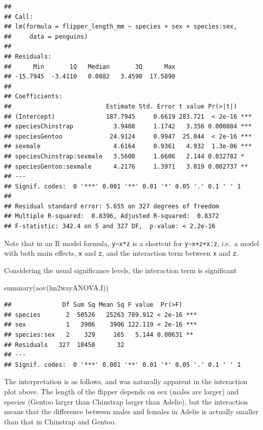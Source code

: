 \documentclass[
]{book}
\newenvironment{Shaded}{\begin{snugshade}}{\end{snugshade}}
\newcommand{\FunctionTok}[1]{\textcolor[rgb]{0.00,0.00,0.00}{#1}}
\newcommand{\NormalTok}[1]{#1}
\begin{document}
\begin{verbatim}
## 
## Call:
## lm(formula = flipper_length_mm ~ species + sex + species:sex, 
##     data = penguins)
## 
## Residuals:
##      Min       1Q   Median       3Q      Max 
## -15.7945  -3.4110   0.0882   3.4590  17.5890 
## 
## Coefficients:
##                          Estimate Std. Error t value Pr(>|t|)    
## (Intercept)              187.7945     0.6619 283.721  < 2e-16 ***
## speciesChinstrap           3.9408     1.1742   3.356 0.000884 ***
## speciesGentoo             24.9124     0.9947  25.044  < 2e-16 ***
## sexmale                    4.6164     0.9361   4.932  1.3e-06 ***
## speciesChinstrap:sexmale   3.5600     1.6606   2.144 0.032782 *  
## speciesGentoo:sexmale      4.2176     1.3971   3.019 0.002737 ** 
## ---
## Signif. codes:  0 '***' 0.001 '**' 0.01 '*' 0.05 '.' 0.1 ' ' 1
## 
## Residual standard error: 5.655 on 327 degrees of freedom
## Multiple R-squared:  0.8396, Adjusted R-squared:  0.8372 
## F-statistic: 342.4 on 5 and 327 DF,  p-value: < 2.2e-16
\end{verbatim}

Note that in an R model formula, \texttt{y\textasciitilde{}x*z} is a shortcut for \texttt{y\textasciitilde{}x+z+x:z}, i.e.~a model with both main effects, \texttt{x} and \texttt{z}, and the interaction term between \texttt{x} and \texttt{z}.

Considering the usual significance levels, the interaction term is significant

\begin{Shaded}
\begin{Highlighting}[]
\FunctionTok{summary}\NormalTok{(}\FunctionTok{aov}\NormalTok{(lm2wayANOVA.I))}
\end{Highlighting}
\end{Shaded}

\begin{verbatim}
##              Df Sum Sq Mean Sq F value  Pr(>F)    
## species       2  50526   25263 789.912 < 2e-16 ***
## sex           1   3906    3906 122.119 < 2e-16 ***
## species:sex   2    329     165   5.144 0.00631 ** 
## Residuals   327  10458      32                    
## ---
## Signif. codes:  0 '***' 0.001 '**' 0.01 '*' 0.05 '.' 0.1 ' ' 1
\end{verbatim}

The interpretation is as follows, and was naturally apparent in the interaction plot above. The length of the flipper depends on sex (males are larger) and species (Gentoo larger than Chinstrap larger than Adelie), but the interaction means that the difference between males and females in Adelie is actually smaller than that in Chinstrap and Gentoo.
\end{document}
